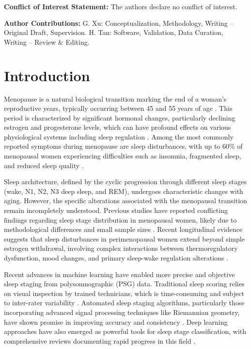 \documentclass[ASNA,twocolumn]{USG}
\begin{document}
\noindent\textbf{Conflict of Interest Statement:} The authors declare no conflict of interest.

\noindent\textbf{Author Contributions:} G. Xu: Conceptualization, Methodology, Writing -- Original Draft, Supervision. H. Tan: Software, Validation, Data Curation, Writing -- Review \& Editing.

\section{Introduction}\label{sec1}

Menopause is a natural biological transition marking the end of a woman's reproductive years, typically occurring between 45 and 55 years of age \cite{Shaver2000}. This period is characterized by significant hormonal changes, particularly declining estrogen and progesterone levels, which can have profound effects on various physiological systems including sleep regulation \cite{PoloKantola1998, Baker2023}. Among the most commonly reported symptoms during menopause are sleep disturbances, with up to 60\% of menopausal women experiencing difficulties such as insomnia, fragmented sleep, and reduced sleep quality \cite{Kravitz2003, deZambotti2023}.

Sleep architecture, defined by the cyclic progression through different sleep stages (wake, N1, N2, N3 deep sleep, and REM), undergoes characteristic changes with aging. However, the specific alterations associated with the menopausal transition remain incompletely understood. Previous studies have reported conflicting findings regarding sleep stage distribution in menopausal women, likely due to methodological differences and small sample sizes \cite{Woods2010, Baker2007}. Recent longitudinal evidence suggests that sleep disturbances in perimenopausal women extend beyond simple estrogen withdrawal, involving complex interactions between thermoregulatory dysfunction, mood changes, and primary sleep-wake regulation alterations \cite{Baker2023, deZambotti2023}.

Recent advances in machine learning have enabled more precise and objective sleep staging from polysomnographic (PSG) data. Traditional sleep scoring relies on visual inspection by trained technicians, which is time-consuming and subject to inter-rater variability \cite{Manber2003}. Automated sleep staging algorithms, particularly those incorporating advanced signal processing techniques like Riemannian geometry, have shown promise in improving accuracy and consistency \cite{Barachant2013, Congedo2017}. Deep learning approaches have also emerged as powerful tools for sleep stage classification, with comprehensive reviews documenting rapid progress in this field \cite{Phan2022, Fiorillo2019}.
\end{document}
